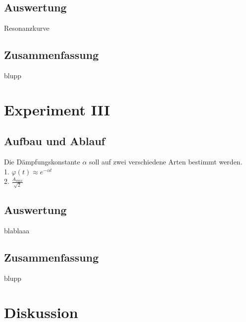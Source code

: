 \documentclass[12pt,a4paper]{article}
\begin{document}
\subsection*{Auswertung}
Resonanzkurve

\subsection*{Zusammenfassung}
blupp

\section*{Experiment III}

\subsection*{Aufbau und Ablauf}
Die D\"ampfungskonstante $\alpha$ soll auf zwei verschiedene Arten bestimmt werden.\\
1. $\varphi(t) \approx e^{-\alpha t}$ \\
2. $\frac{A_{max}}{\sqrt{2}}$\\

\subsection*{Auswertung}
blablaaa

\subsection*{Zusammenfassung}
blupp

\section*{Diskussion}
\end{document}
